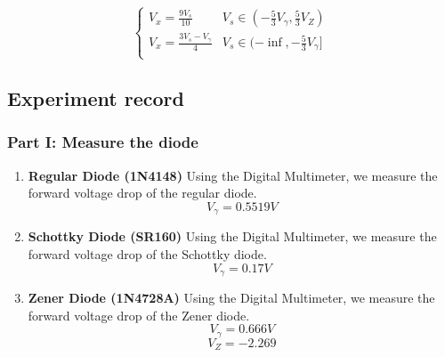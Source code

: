 \begin{enumerate}[a]
\begin{equation}
\begin{cases}
                        V_x = \frac{9V_s}{10} 
                        & V_s \in (-\frac{5}{3}V_\gamma, \frac{5}{3}V_Z)\\

                        V_x = \frac{3V_s-V_\gamma}{4} 
                        & V_s \in (-\inf, -\frac{5}{3}V_\gamma]\\
                    \end{cases}
                \label{l1eq4}
                \end{equation}
        \end{enumerate}

\subsection{Experiment record}
    \subsubsection{Part I: Measure the diode}
        \begin{enumerate}[I]
            \item \textbf{Regular Diode (1N4148)}\newline
                Using the Digital Multimeter, we measure the forward voltage drop of the regular diode. 
                \[V_{\gamma} = 0.5519V\]
            \item \textbf{Schottky Diode (SR160)}\newline
                Using the Digital Multimeter, we measure the forward voltage drop of the Schottky diode. 
                \[V_{\gamma} = 0.17V\]
            \item \textbf{Zener Diode (1N4728A)}\newline
                Using the Digital Multimeter, we measure the forward voltage drop of the Zener diode. 
                \[V_{\gamma} = 0.666V\]
                \[V_Z = -2.269\]
        \end{enumerate}


